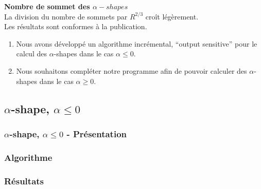 \begin{frame}
\begin{columns}[t]
\begin{column}{0.9\linewidth}
  \end{column}
\end{columns}

{
\begin{exampleblock}{}
  \textbf{Nombre de sommet des $\alpha-shapes$}\\
  La division du nombre de sommets par $R^{2/3}$ croît légèrement.\\
  Les résultats sont conformes à la publication.\\
\end{exampleblock} 
} 
{
\begin{alertblock}{}
  \begin{enumerate}
    \item Nous avons développé un algorithme incrémental, ``output sensitive'' pour le calcul des $\alpha$-shapes dans le cas $\alpha \leq 0$. 
    \item Nous souhaitons compléter notre programme afin de pouvoir calculer des $\alpha$-shapes dans le cas $\alpha \geq 0$.
  \end{enumerate}
\end{alertblock} 
} 
 
\end{frame}

\subsection{$\alpha$-shape, $\alpha \leq 0$}

\begin{frame}
\frametitle{$\alpha$-shape, $\alpha \leq 0$ - Présentation}

\end{frame}

\begin{frame}
\frametitle{Algorithme}

\end{frame}

\begin{frame}
\frametitle{Résultats}

\end{frame}


